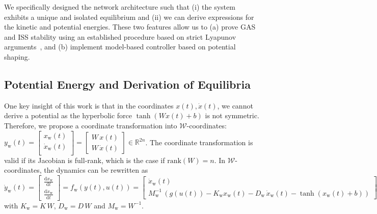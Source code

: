 We specifically designed the network architecture such that (i) the system exhibits a unique and isolated equilibrium and (ii) we can derive expressions for the kinetic and potential energies. These two features allow us to (a) prove \gls{GAS} and \gls{ISS} stability using an established procedure based on strict Lyapunov arguments~\citep{calzolari2020exponential, wu2022passive}, and (b) implement model-based controller based on potential shaping.

\subsection{Potential Energy and Derivation of Equilibria}

One key insight of this work is that in the coordinates $x(t), \dot{x}(t)$, we cannot derive a potential 
as the hyperbolic force $\tanh(W x(t) + b)$ is not symmetric. Therefore, we propose a coordinate transformation into $\mathcal{W}$-coordinates: $y_\mathrm{w}(t) = \begin{bmatrix}
    x_\mathrm{w}(t)\\
    \dot{x}_\mathrm{w}(t)\\
\end{bmatrix} = \begin{bmatrix}
    W \, x(t)\\
    W \, \dot{x}(t)
\end{bmatrix} \in \mathbb{R}^{2n}$. The coordinate transformation is valid if its Jacobian is full-rank, which is the case if $\mathrm{rank}(W) = n$.
In $\mathcal{W}$-coordinates, the dynamics can be rewritten as
\begin{equation}\label{eq:con:conw_dynamics}
    \dot{y}_\mathrm{w}(t) = \begin{bmatrix}
        \frac{\mathrm{d}x_\mathrm{w}}{\mathrm{d}t}\\
        \frac{\mathrm{d}\dot{x}_\mathrm{w}}{\mathrm{d}t}
    \end{bmatrix} = f_\mathrm{w}(y(t), u(t)) = \begin{bmatrix}
        \dot{x}_\mathrm{w}(t)\\
        M_\mathrm{w}^{-1} \, \left (g(u(t)) -K_\mathrm{w} x_\mathrm{w}(t) - D_\mathrm{w} \, \dot{x}_\mathrm{w}(t) - \tanh(x_\mathrm{w}(t) + b) \right )
    \end{bmatrix}
\end{equation}
with $K_\mathrm{w} = K \, W$, $D_\mathrm{w} = D \, W$ and $M_\mathrm{w} = W^{-1}$. 

